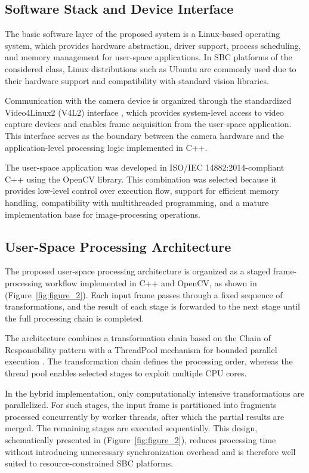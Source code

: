 \documentclass[
]{ceurart}
\begin{document}
\subsection{Software Stack and Device Interface}

The basic software layer of the proposed system is a Linux-based operating system, which provides hardware abstraction, driver support, process scheduling, and memory management for user-space applications. In SBC platforms of the considered class, Linux distributions such as Ubuntu are commonly used due to their hardware support and compatibility with standard vision libraries.

Communication with the camera device is organized through the standardized Video4Linux2 (V4L2) interface \cite{schimek2024v4l2}, which provides system-level access to video capture devices and enables frame acquisition from the user-space application. This interface serves as the boundary between the camera hardware and the application-level processing logic implemented in C++.

The user-space application was developed in ISO/IEC 14882:2014-compliant C++ using the OpenCV library. This combination was selected because it provides low-level control over execution flow, support for efficient memory handling, compatibility with multithreaded programming, and a mature implementation base for image-processing operations.

\subsection{User-Space Processing Architecture}

The proposed user-space processing architecture is organized as a staged frame-processing workflow implemented in C++ and OpenCV, as shown in (Figure~\ref{fig:figure_2}). Each input frame passes through a fixed sequence of transformations, and the result of each stage is forwarded to the next stage until the full processing chain is completed.

The architecture combines a transformation chain based on the Chain of Responsibility pattern \cite{qi2010chain} with a ThreadPool mechanism for bounded parallel execution \cite{Puyda_2025}. The transformation chain defines the processing order, whereas the thread pool enables selected stages to exploit multiple CPU cores.

In the hybrid implementation, only computationally intensive transformations are parallelized. For such stages, the input frame is partitioned into fragments processed concurrently by worker threads, after which the partial results are merged. The remaining stages are executed sequentially. This design, schematically presented in (Figure~\ref{fig:figure_2}), reduces processing time without introducing unnecessary synchronization overhead and is therefore well suited to resource-constrained SBC platforms.
\end{document}

